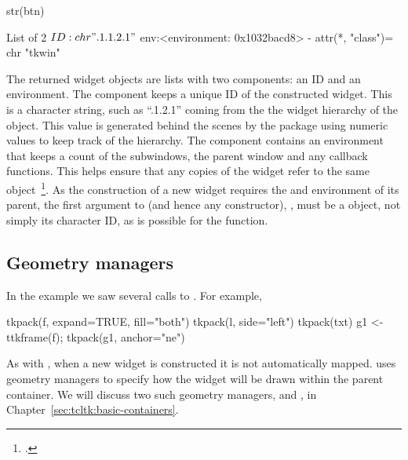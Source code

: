 \begin{Schunk}
\begin{Sinput}
 str(btn)
\end{Sinput}
\begin{Soutput}
List of 2
 $ ID : chr ".1.1.2.1"
 $ env:<environment: 0x1032bacd8> 
 - attr(*, "class")= chr "tkwin"
\end{Soutput}
\end{Schunk}

The returned widget objects are lists with two components: an ID and an
environment. The  component keeps a unique ID of the
constructed widget. This is a character string, such as ``.1.2.1''
coming from the the widget hierarchy of the object. This value is
generated behind the scenes by the  package using numeric
values to keep track of the hierarchy. The  component
contains an environment that keeps a count of the subwindows, the parent
window and any callback functions. This helps ensure that any copies
of the widget refer to the same object~\footcite{Dalgaard-DSC}. As the
construction of a new widget requires the  and environment of
its parent, the first argument to  (and hence any constructor), ,
must be a  object, not simply its character ID, as is
possible for the  function.


\subsection{Geometry managers}
\label{sec:tcltk:overview:geometry-managers}

In the example we saw several calls to . For example,

\begin{Schunk}
\begin{Sinput}
 tkpack(f, expand=TRUE, fill="both")
 tkpack(l, side="left")
 tkpack(txt)
 g1 <- ttkframe(f); tkpack(g1, anchor="ne")
\end{Sinput}
\end{Schunk}


As with \Qt, when a new widget is constructed it is not automatically
mapped. \TK\/ uses geometry managers to specify how the widget will be
drawn within the parent container. We will discuss two such geometry
managers,  and , in Chapter~\ref{sec:tcltk:basic-containers}.

